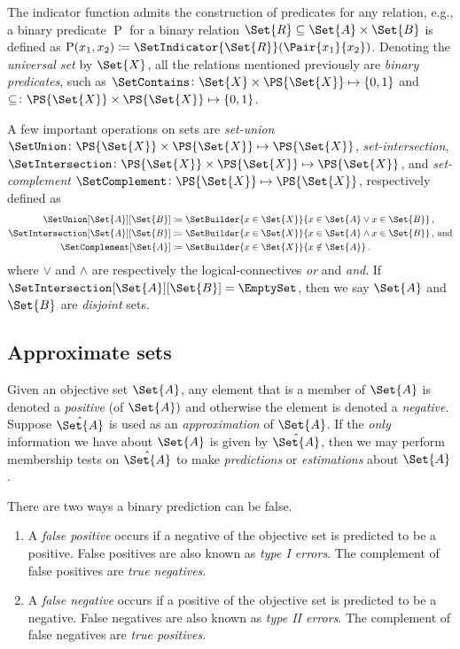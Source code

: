 \documentclass[10pt,final,hidelinks]{article}
\numberwithin{equation}{section}
\begin{document}
The indicator function admits the construction of predicates for any relation, e.g., a binary predicate $\operatorname{P}$ for a binary relation $\Set{R} \subseteq \Set{A} \times \Set{B}$ is defined as $\operatorname{P}(x_1,x_2) \coloneqq \SetIndicator{\Set{R}}(\Pair{x_1}{x_2})$.
Denoting the \emph{universal set} by $\Set{X}$, all the relations mentioned previously are \emph{binary predicates}, such as $\SetContains \colon \Set{X} \times \PS{\Set{X}} \mapsto \{0,1\}$ and $\subseteq \colon \PS{\Set{X}} \times \PS{\Set{X}} \mapsto \{0,1\}$.

A few important operations on sets are \emph{set-union} $\SetUnion \colon \PS{\Set{X}} \times \PS{\Set{X}} \mapsto \PS{\Set{X}}$, \emph{set-intersection}, $\SetIntersection \colon \PS{\Set{X}} \times \PS{\Set{X}} \mapsto \PS{\Set{X}}$, and \emph{set-complement} $\SetComplement \colon \PS{\Set{X}} \mapsto \PS{\Set{X}}$, respectively defined as
\begin{align}
	\SetUnion[\Set{A}][\Set{B}]			&\coloneqq \SetBuilder{ x \in \Set{X}}{x \in \Set{A} \lor x \in \Set{B}}\,,\\
	\SetIntersection[\Set{A}][\Set{B}]	&\coloneqq \SetBuilder{ x \in \Set{X}}{x \in \Set{A} \land x \in \Set{B}}\,,\,\text{and}\\
	\SetComplement[\Set{A}]				&\coloneqq \SetBuilder{ x \in \Set{X}}{x \notin \Set{A}}\,.
\end{align}
where $\lor$ and $\land$ are respectively the logical-connectives \emph{or} and \emph{and}.
If $\SetIntersection[\Set{A}][\Set{B}] = \EmptySet$, then we say $\Set{A}$ and $\Set{B}$ are \emph{disjoint} sets.

\subsection{Approximate sets}
\label{sec:asets}
Given an objective set $\Set{A}$, any element that is a member of $\Set{A}$ is denoted a \emph{positive} (of $\Set{A})$ and otherwise the element is denoted a \emph{negative}.
Suppose $\hat{\Set{A}}$ is used as an \emph{approximation} of $\Set{A}$.
If the \emph{only} information we have about $\Set{A}$ is given by $\hat{\Set{A}}$, then we may perform membership tests on $\hat{\Set{A}}$ to make \emph{predictions} or \emph{estimations} about $\Set{A}$.

There are two ways a binary prediction can be false.
\begin{enumerate}
	\item A \emph{false positive} occurs if a negative of the objective set is predicted to be a positive. False positives are also known as \emph{type I errors}.
	The complement of false positives are \emph{true negatives}.
	\item A \emph{false negative} occurs if a positive of the objective set is predicted to be a negative. False negatives are also known as \emph{type II errors}.
	The complement of false negatives are \emph{true positives}.
\end{enumerate} 
\end{document}

